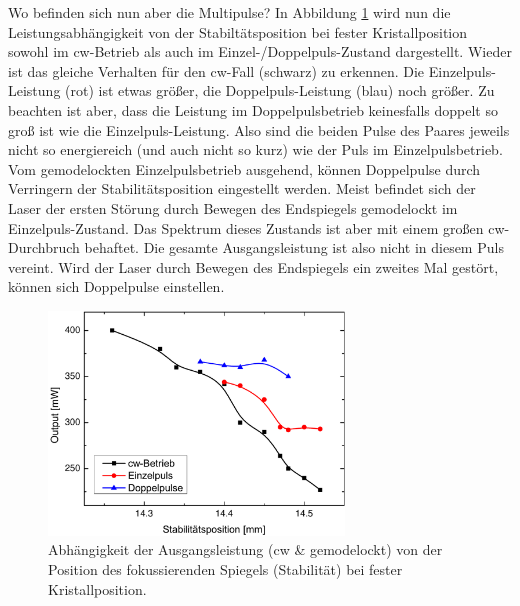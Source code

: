 \documentclass[bachelor,       %
               twoside,        %
               BCOR10mm,       %
               english,ngerman, %
               ]{GAUBM}
\begin{document}
Wo befinden sich nun aber die Multipulse?
In Abbildung \ref{fig:map2} wird nun die Leistungsabhängigkeit von der Stabiltätsposition bei fester Kristallposition sowohl im cw-Betrieb als auch im Einzel-/Doppelpuls-Zustand  dargestellt.
Wieder ist das gleiche Verhalten für den cw-Fall (schwarz) zu erkennen.
Die Einzelpuls-Leistung (rot) ist etwas größer, die Doppelpuls-Leistung (blau) noch größer.
Zu beachten ist aber, dass die Leistung im Doppelpulsbetrieb keinesfalls doppelt so groß ist wie die Einzelpuls-Leistung.
Also sind die beiden Pulse des Paares jeweils nicht so energiereich (und auch nicht so kurz) wie der Puls im Einzelpulsbetrieb.
Vom gemodelockten Einzelpulsbetrieb ausgehend, können Doppelpulse durch Verringern der Stabilitätsposition eingestellt werden.
Meist befindet sich der Laser der ersten Störung durch Bewegen des Endspiegels gemodelockt im Einzelpuls-Zustand.
Das Spektrum dieses Zustands ist aber mit einem großen cw-Durchbruch behaftet.
Die gesamte Ausgangsleistung ist also nicht in diesem Puls vereint.
Wird der Laser durch Bewegen des Endspiegels ein zweites Mal gestört, können sich Doppelpulse einstellen.

\begin{figure}[!htb]
	\centering
	\includegraphics[width=0.7\textwidth]{figures/map2.pdf}
	\caption{Abhängigkeit der Ausgangsleistung (cw \& gemodelockt) von der Position des fokussierenden Spiegels (Stabilität) bei fester Kristallposition.}
	\label{fig:map2}
\end{figure}
\end{document}
